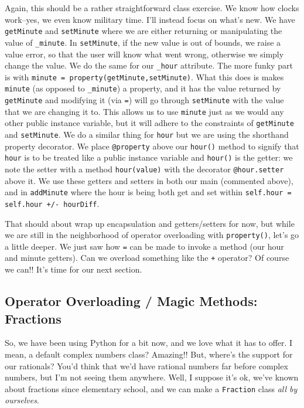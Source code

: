 \documentclass[11pt, twoside, reqno]{book}
\begin{document}
Again, this should be a rather straightforward class exercise. We know how clocks work--yes, we even know military time. I'll instead focus on what's new. We have \texttt{getMinute} and \texttt{setMinute} where we are either returning or manipulating the value of \texttt{\_minute}. In \texttt{setMinute}, if the new value is out of bounds, we raise a value error, so that the user will know what went wrong, otherwise we simply change the value. We do the same for our \texttt{\_hour} attribute. The more funky part is with \texttt{minute = property(getMinute,setMinute)}. What this does is makes \texttt{minute} (as opposed to \texttt{\_minute}) a property, and it has the value returned by \texttt{getMinute} and modifying it (via \texttt{=}) will go through \texttt{setMinute} with the value that we are changing it to. This allows us to use \texttt{minute} just as we would any other public instance variable, but it will adhere to the constraints of \texttt{getMinute} and \texttt{setMinute}. We do a similar thing for \texttt{hour} but we are using the shorthand property decorator. We place \texttt{@property} above our \texttt{hour()} method to signify that \texttt{hour} is to be treated like a public instance variable and \texttt{hour()} is the getter: we note the setter with a method \texttt{hour(value)} with the decorator \texttt{@hour.setter} above it. We use these getters and setters in both our main (commented above), and in \texttt{addMinute} where the hour is being both get and set within \texttt{self.hour = self.hour +/- hourDiff}.

That should about wrap up encapsulation and getters/setters for now, but while we are still in the neighborhood of operator overloading with \texttt{property()}, let's go a little deeper. We just saw how \texttt{=} can be made to invoke a method (our hour and minute getters). Can we overload something like the \texttt{+} operator? Of course we can!! It's time for our next section.

\subsection{Operator Overloading / Magic Methods: Fractions}

So, we have been using Python for a bit now, and we love what it has to offer. I mean, a default complex numbers class? Amazing!! But, where's the support for our rationals? You'd think that we'd have rational numbers far before complex numbers, but I'm not seeing them anywhere. Well, I suppose it's ok, we've known about fractions since elementary school, and we can make a \texttt{Fraction} class \textit{all by ourselves}.
\end{document}
